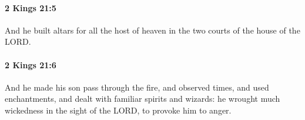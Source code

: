 		\paragraph{2 Kings 21:5} %
			\label{2KINGS-21-5}

			And he built altars for all the host of heaven in the two courts of the house of the LORD.


		\paragraph{2 Kings 21:6} %
			\label{2KINGS-21-6}

			And he made his son pass through the fire, and observed times, and used enchantments, and dealt with familiar spirits and wizards: he wrought much wickedness in the sight of the LORD, to provoke him to anger.


